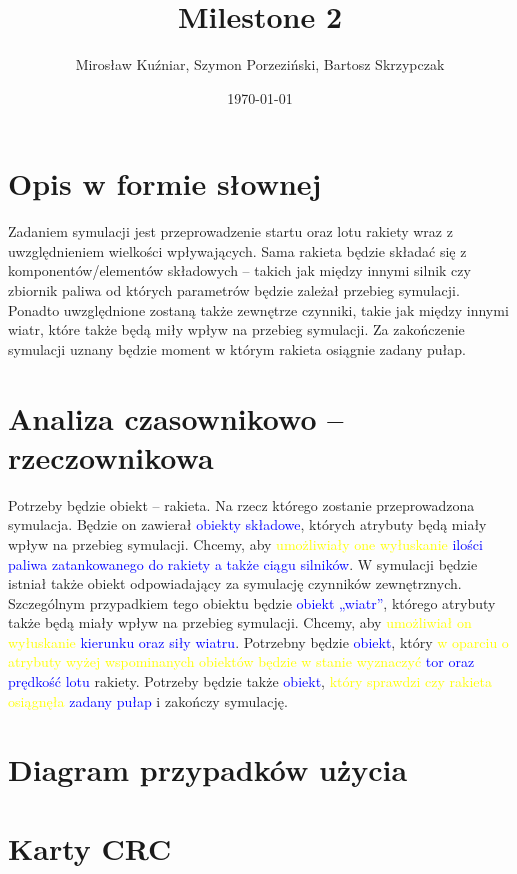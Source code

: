 \documentclass{article}
\title{Milestone 2}
\author{Mirosław Kuźniar, Szymon Porzeziński, Bartosz Skrzypczak }
\date{\today}
\begin{document}
\maketitle

\section{Opis w formie słownej}
Zadaniem symulacji jest przeprowadzenie startu oraz lotu rakiety wraz z uwzględnieniem wielkości wpływających. Sama rakieta będzie składać się z komponentów/elementów składowych – takich jak między innymi silnik czy zbiornik paliwa od których parametrów będzie zależał przebieg symulacji. Ponadto uwzględnione zostaną także zewnętrze czynniki, takie jak między innymi wiatr, które także będą miły wpływ na przebieg symulacji. Za zakończenie symulacji uznany będzie moment w którym rakieta osiągnie zadany pułap. 

\section{Analiza czasownikowo – rzeczownikowa}
Potrzeby będzie obiekt – rakieta. Na rzecz którego zostanie przeprowadzona symulacja. Będzie on zawierał \textcolor{blue}{obiekty składowe}, których atrybuty będą miały wpływ na przebieg symulacji. Chcemy, aby \textcolor{yellow}{umożliwiały one wyłuskanie} \textcolor{blue}{ilości paliwa zatankowanego do rakiety a także ciągu silników}. W symulacji będzie istniał także obiekt odpowiadający za symulację czynników zewnętrznych. Szczególnym przypadkiem tego obiektu będzie \textcolor{blue}{obiekt „wiatr”}, którego atrybuty także będą miały wpływ na przebieg symulacji. Chcemy, aby \textcolor{yellow}{umożliwiał on wyłuskanie} \textcolor{blue}{kierunku oraz siły wiatru}. Potrzebny będzie \textcolor{blue}{obiekt}, który \textcolor{yellow}{w oparciu o atrybuty wyżej wspominanych obiektów będzie w stanie wyznaczyć} \textcolor{blue}{tor oraz prędkość lotu} rakiety. Potrzeby będzie także  \textcolor{blue}{obiekt}, \textcolor{yellow}{który sprawdzi czy rakieta osiągnęła} \textcolor{blue}{zadany pułap} i zakończy symulację. 

\section{Diagram przypadków użycia}

\section{Karty CRC}
\end{document}
